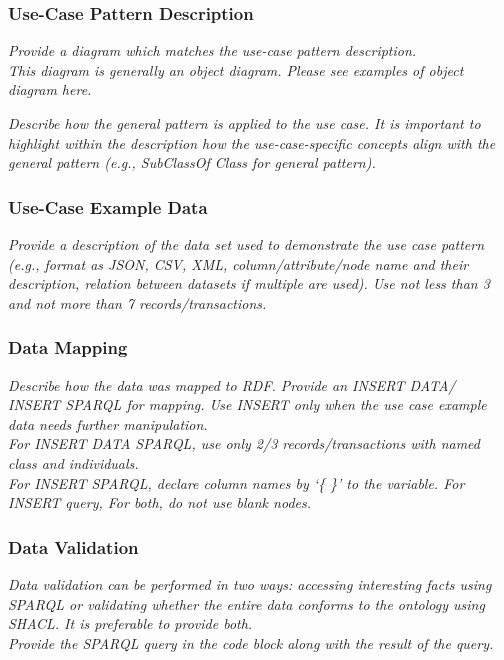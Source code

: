 \subsubsection*{Use-Case Pattern Description}
 \textit{ 
Provide a diagram which matches the use-case pattern description. \\
\noindent \textit{This diagram is generally an object diagram. Please see examples of object diagram here.}
  }

 \textit{ 
Describe how the general pattern is applied to the use case. It is important to highlight within the description how the use-case-specific concepts align with the general pattern (e.g., SubClassOf Class for general pattern).
  }

\subsubsection*{Use-Case Example Data}
 \textit{ 
Provide a description of the data set used to demonstrate the use case pattern (e.g., format as JSON, CSV, XML, column/attribute/node name and their description, relation between datasets if multiple are used). Use not less than 3 and not more than 7 records/transactions.
  }

\subsubsection*{Data Mapping}
 \textit{ 
Describe how the data was mapped to RDF. Provide an INSERT DATA/ INSERT SPARQL for mapping. Use INSERT only when the use case example data needs further manipulation. \\
For INSERT DATA SPARQL, use only 2/3 records/transactions with named class and individuals. \\
For INSERT SPARQL, declare column names by `\{ \}' to the variable.  
For INSERT query, 
For both, do not use blank nodes.    
  }

\subsubsection*{Data Validation}
 \textit{ 
Data validation can be performed in two ways: accessing interesting facts using SPARQL or validating whether the entire data conforms to the ontology using SHACL. It is preferable to provide both. \\
Provide the SPARQL query in the code block along with the result of the query. \\
  }